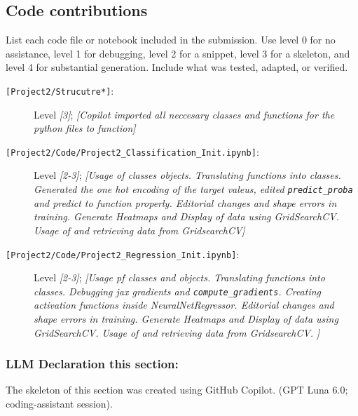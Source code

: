 \subsection{Code contributions}

List each code file or notebook included in the submission. Use level 0 for no
assistance, level 1 for debugging, level 2 for a snippet, level 3 for a
skeleton, and level 4 for substantial generation. Include what was tested,
adapted, or verified.
\begin{description}
    \item[\texttt{[Project2/Strucutre*]}:] Level \textit{[3]};
    \textit{[Copilot imported all neccesary classes and functions for the python files to function]}
\end{description}

\begin{description}
    \item[\texttt{[Project2/Code/Project2\_Classification\_Init.ipynb]}:] Level \textit{[2-3]};
    \textit{[Usage of classes objects. Translating functions into classes. Generated the one hot encoding of the target valeus, edited \texttt{predict\_proba} and predict to function properly. Editorial changes and shape errors in training. Generate Heatmaps and Display of data using GridSearchCV. Usage of and retrieving data from GridsearchCV]}
\end{description}

\begin{description}
    \item[\texttt{[Project2/Code/Project2\_Regression\_Init.ipynb]}:] Level \textit{[2-3]};
    \textit{[Usage pf classes and objects. Translating functions into classes. Debugging jax gradients and \texttt{compute\_gradients}. Creating activation functions inside NeuralNetRegressor. Editorial changes and shape errors in training. Generate Heatmaps and Display of data using GridSearchCV. Usage of and retrieving data from GridsearchCV. ]}
\end{description}

\subsubsection{LLM Declaration this section:}
The skeleton of this section was created using GitHub Copilot.  
(GPT Luna 6.0; coding-assistant session). 
